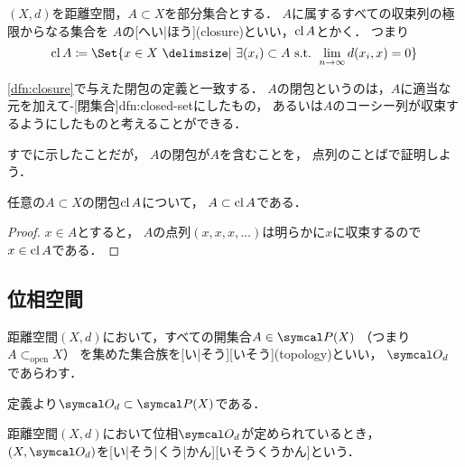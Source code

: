 \documentclass[../sotsu.tex]{subfiles}
\begin{document}
\begin{definition}[点列による閉包の定義]
    \label{dfn:closure-by-sequence}
    $(X, d)$を距離空間，$A \subset X$を部分集合とする．
    $A$に属するすべての収束列の極限からなる集合を
    $A$の[へい|ほう](closure)といい，$\operatorname{cl}{A}$とかく．
    つまり
    \begin{equation}
        \closureop{A} \coloneq \Set{ x \in X  \given  \exists (x_i) \subset A \text{ s.t. } \lim_{n \to \infty} d(x_i, x) = 0 }
    \end{equation}
\end{definition}

\cref{dfn:closure}で与えた閉包の定義と一致する．
$A$の閉包というのは，$A$に適当な元を加えて-[閉集合]{dfn:closed-set}にしたもの，
あるいは$A$のコーシー列が収束するようにしたものと考えることができる．

すでに示したことだが，
$A$の閉包が$A$を含むことを，
点列のことばで証明しよう．

\begin{corollary}
    任意の$A \subset X$の閉包$\operatorname{cl}{A}$について，
    $A \subset \operatorname{cl}{A}$である．
\end{corollary}

\begin{proof}
    $x \in A$とすると，
    $A$の点列$(x, x, x, \dotsc)$は明らかに$x$に収束するので$x \in \operatorname{cl}{A}$である．
\end{proof}



\subsection{位相空間}

\begin{definition}
    \label{dfn:topology}
    距離空間$(X, d)$において，すべての開集合$A \in \pset(X)$
    （つまり$A \subset_{\text{open}} X$）
    を集めた集合族を[い|そう][いそう](topology)といい，
    $\topology_d$であらわす．
\end{definition}

定義より$\topology_d \subset \pset(X)$である．

\begin{definition}
    \label{dfn:topological-space}
    距離空間$(X, d)$において位相$\topology_d$が定められているとき，
    $(X, \topology_d)$を[い|そう|くう|かん][いそうくうかん]という．
\end{definition}
\end{document}
